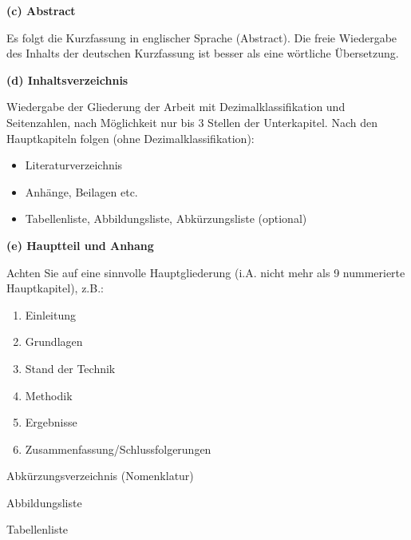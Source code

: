 \textbf{(c) Abstract}

\vspace{1mm}

Es folgt die Kurzfassung in englischer Sprache (Abstract). Die freie Wiedergabe des Inhalts der deutschen Kurzfassung ist besser als eine wörtliche Übersetzung.

\vspace{1mm}


\textbf{(d) Inhaltsverzeichnis}

\vspace{1mm}

Wiedergabe der Gliederung der Arbeit mit Dezimalklassifikation und Seitenzahlen, nach Möglichkeit nur bis 3 Stellen der Unterkapitel. Nach den Hauptkapiteln folgen (ohne Dezimalklassifikation):

\begin{itemize}
    \item Literaturverzeichnis
    \item Anhänge, Beilagen etc.
    \item Tabellenliste, Abbildungsliste, Abkürzungsliste (optional)
\end{itemize}


\textbf{(e) Hauptteil und Anhang}

\vspace{1mm}

Achten Sie auf eine sinnvolle Hauptgliederung (i.A. nicht mehr als 9 nummerierte Hauptkapitel), z.B.:

\begin{enumerate}
    \item Einleitung
    \item Grundlagen
    \item Stand der Technik
    \item Methodik
    \item Ergebnisse
    \item Zusammenfassung/Schlussfolgerungen
\end{enumerate}
\hspace{5mm}
Abkürzungsverzeichnis (Nomenklatur)

\vspace{1mm}

\hspace{5mm}
Abbildungsliste

\vspace{1mm}

\hspace{5mm}
Tabellenliste

